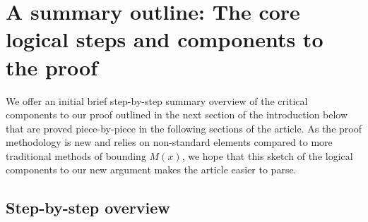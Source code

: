 \documentclass[11pt,reqno,a4letter]{article}
\numberwithin{figure}{section}
\numberwithin{table}{section}
\theoremstyle{plain}
\numberwithin{theorem}{section}
\theoremstyle{definition}
\begin{document}
\newpage
\section{A summary outline: The core logical steps and components to the proof} 

We offer an initial brief step-by-step summary overview of the critical components 
to our proof outlined in the next section of the introduction below 
that are proved piece-by-piece in the following sections of the article. 
As the proof methodology is new and relies on non-standard elements compared to more 
traditional methods of bounding $M(x)$, we hope that this sketch of the logical components 
to our new argument makes the article easier to parse. 

\subsection{Step-by-step overview} 
\end{document}

